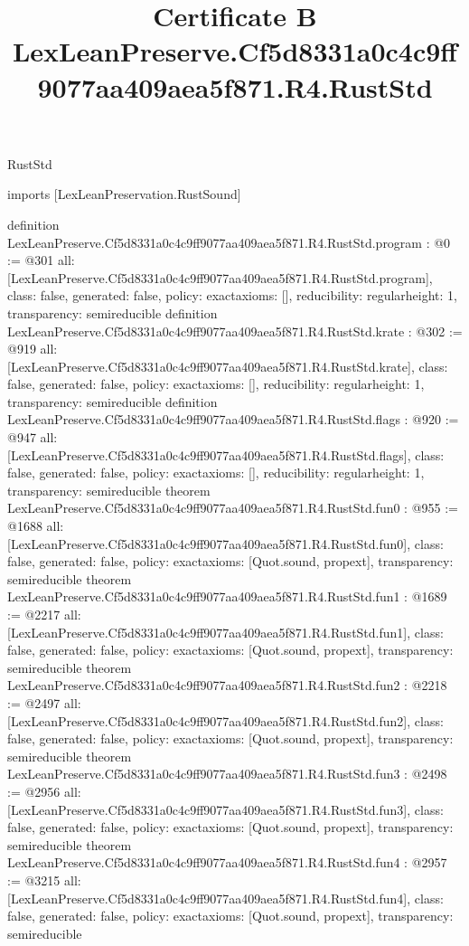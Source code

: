\begin{lexlean}{RustStd}
\title{Certificate B LexLeanPreserve.Cf5d8331a0c4c9ff9077aa409aea5f871.R4.RustStd}
\begin{coremodule}
imports [LexLeanPreservation.RustSound]

definition LexLeanPreserve.Cf5d8331a0c4c9ff9077aa409aea5f871.R4.RustStd.program : @0 := @301 {
  all: [LexLeanPreserve.Cf5d8331a0c4c9ff9077aa409aea5f871.R4.RustStd.program],
  class: false,
  generated: false,
  policy: exact{axioms: []},
  reducibility: regular{height: 1},
  transparency: semireducible
}
definition LexLeanPreserve.Cf5d8331a0c4c9ff9077aa409aea5f871.R4.RustStd.krate : @302 := @919 {
  all: [LexLeanPreserve.Cf5d8331a0c4c9ff9077aa409aea5f871.R4.RustStd.krate],
  class: false,
  generated: false,
  policy: exact{axioms: []},
  reducibility: regular{height: 1},
  transparency: semireducible
}
definition LexLeanPreserve.Cf5d8331a0c4c9ff9077aa409aea5f871.R4.RustStd.flags : @920 := @947 {
  all: [LexLeanPreserve.Cf5d8331a0c4c9ff9077aa409aea5f871.R4.RustStd.flags],
  class: false,
  generated: false,
  policy: exact{axioms: []},
  reducibility: regular{height: 1},
  transparency: semireducible
}
theorem LexLeanPreserve.Cf5d8331a0c4c9ff9077aa409aea5f871.R4.RustStd.fun0 : @955 := @1688 {
  all: [LexLeanPreserve.Cf5d8331a0c4c9ff9077aa409aea5f871.R4.RustStd.fun0],
  class: false,
  generated: false,
  policy: exact{axioms: [Quot.sound, propext]},
  transparency: semireducible
}
theorem LexLeanPreserve.Cf5d8331a0c4c9ff9077aa409aea5f871.R4.RustStd.fun1 : @1689 := @2217 {
  all: [LexLeanPreserve.Cf5d8331a0c4c9ff9077aa409aea5f871.R4.RustStd.fun1],
  class: false,
  generated: false,
  policy: exact{axioms: [Quot.sound, propext]},
  transparency: semireducible
}
theorem LexLeanPreserve.Cf5d8331a0c4c9ff9077aa409aea5f871.R4.RustStd.fun2 : @2218 := @2497 {
  all: [LexLeanPreserve.Cf5d8331a0c4c9ff9077aa409aea5f871.R4.RustStd.fun2],
  class: false,
  generated: false,
  policy: exact{axioms: [Quot.sound, propext]},
  transparency: semireducible
}
theorem LexLeanPreserve.Cf5d8331a0c4c9ff9077aa409aea5f871.R4.RustStd.fun3 : @2498 := @2956 {
  all: [LexLeanPreserve.Cf5d8331a0c4c9ff9077aa409aea5f871.R4.RustStd.fun3],
  class: false,
  generated: false,
  policy: exact{axioms: [Quot.sound, propext]},
  transparency: semireducible
}
theorem LexLeanPreserve.Cf5d8331a0c4c9ff9077aa409aea5f871.R4.RustStd.fun4 : @2957 := @3215 {
  all: [LexLeanPreserve.Cf5d8331a0c4c9ff9077aa409aea5f871.R4.RustStd.fun4],
  class: false,
  generated: false,
  policy: exact{axioms: [Quot.sound, propext]},
  transparency: semireducible
}
\end{coremodule}
\end{lexlean}
